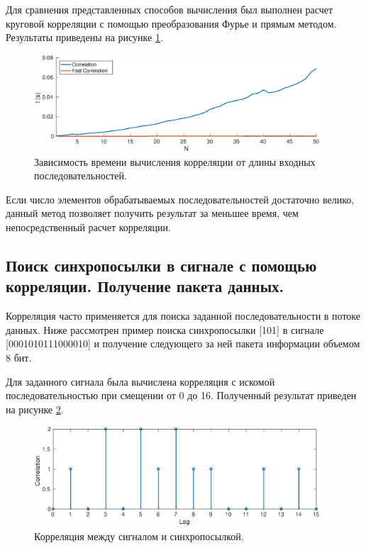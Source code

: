 \documentclass[a4paper,14pt]{extarticle}
\begin{document}
Для сравнения представленных способов вычисления был выполнен расчет круговой корреляции с помощью преобразования Фурье и прямым методом. Результаты приведены на рисунке \ref{tm}.
\begin{figure}[H]
\centering
\includegraphics[width=0.95\textwidth]{time_measure.eps}
\captionsetup{justification=centering,margin=1cm}
\caption{Зависимость времени вычисления корреляции от длины входных последовательностей.}
\label{tm}
\end{figure}
Если число элементов обрабатываемых последовательностей достаточно велико, данный метод позволяет получить результат за меньшее время, чем непосредственный расчет корреляции.

\subsection{Поиск синхропосылки в сигнале с помощью корреляции. Получение пакета данных.}

Корреляция часто применяется для поиска заданной последовательности в потоке данных. Ниже рассмотрен пример поиска синхропосылки 
[101] в сигнале [0001010111000010] и получение следующего за ней пакета информации объемом 8 бит.

Для заданного сигнала была вычислена корреляция с искомой последовательностью при смещении от 0 до 16. Полученный результат приведен на рисунке \ref{corr}.

\begin{figure}[H]
\centering
\includegraphics[width=0.95\textwidth]{corr.eps}
\captionsetup{justification=centering,margin=1cm}
\caption{Корреляция между сигналом и синхропосылкой.}
\label{corr}
\end{figure}
\end{document}
